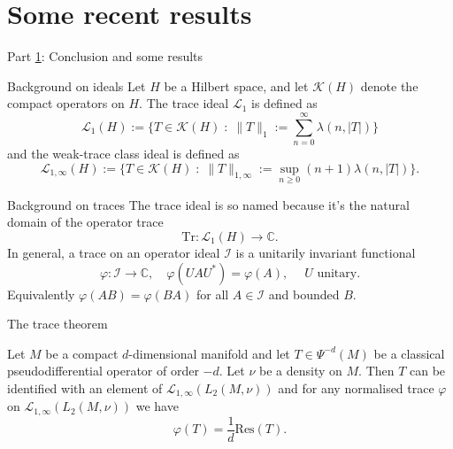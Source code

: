 \documentclass{beamer}
\numberwithin{equation}{section}
\theoremstyle{plain}
\theoremstyle{plain}
\theoremstyle{definition}
\theoremstyle{plain}
\theoremstyle{plain}
\theoremstyle{definition}
\newcommand{\Cplx}{\mathbb{C}}
\newcommand{\Ic}{\mathcal{I}}
\newcommand{\Kc}{\mathcal{K}}
\newcommand{\Lc}{\mathcal{L}}
\newcommand{\Tr}{\mathrm{Tr}}
\begin{document}
\section{Some recent results}\label{conclusion_section}

\begin{frame}
    \Huge{Part \ref{conclusion_section}: Conclusion and some results}
\end{frame}

\begin{frame}{Background on ideals}
    Let $H$ be a Hilbert space, and let $\Kc(H)$ denote the compact operators on $H.$
    The trace ideal $\Lc_1$ is defined as
    \[
        \Lc_1(H) := \{T\in \Kc(H)\;:\;\|T\|_1 := \sum_{n=0}^\infty \lambda(n,|T|)\}
    \]
    and the weak-trace class ideal is defined as
    \[
        \Lc_{1,\infty}(H) := \{T \in \Kc(H)\;:\;\|T\|_{1,\infty} := \sup_{n\geq 0} (n+1)\lambda(n,|T|)\}.
    \]
\end{frame}

\begin{frame}{Background on traces}
    The trace ideal is so named because it's the natural domain of the operator trace
    \[
        \Tr:\Lc_1(H)\to \Cplx.
    \]
    In general, a trace on an operator ideal $\Ic$ is a unitarily invariant functional
    \[
        \varphi:\Ic\to \Cplx,\quad \varphi(UAU^*)=\varphi(A),\; \quad U \text{ unitary.}
    \]
    Equivalently $\varphi(AB)=\varphi(BA)$ for all $A \in \Ic$ and bounded $B.$
\end{frame}

\begin{frame}{The trace theorem}
    \begin{theorem}\label{ctt_original}
        Let $M$ be a compact $d$-dimensional manifold and let $T\in \Psi^{-d}(M)$ be a classical pseudodifferential operator of order $-d.$ Let $\nu$ be a density on $M.$
        Then $T$ can be identified with an element of $\Lc_{1,\infty}(L_2(M,\nu))$ and for any normalised trace $\varphi$ on $\Lc_{1,\infty}(L_2(M,\nu))$ we have
        \[
            \varphi(T) = \frac{1}{d}\mathrm{Res}(T).
        \]
    \end{theorem}
\end{frame}
\end{document}
